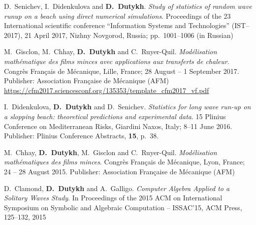 \documentclass[final, a4paper, oneside, 12pt]{article}
\numberwithin{equation}{section}
\begin{document}
\begin{etaremune}
  \item D.~Senichev, I.~Didenkulova and \textbf{D.~Dutykh}. \textit{Study of statistics of random wave runup on a beach using direct numerical simulations}. Proceedings of the 23 International scientific conference ``Information Systems and Technologies'' (IST--2017), 21 April 2017, Nizhny Novgorod, Russia; pp.~1001--1006 (in Russian) %
  
  \item M.~Gisclon, M.~Chhay, \textbf{D.~Dutykh} and C.~Ruyer-Quil. \textit{Mod\'elisation math\'ematique des films minces avec applications aux transferts de chaleur}. Congr\`es Fran\c{c}ais de M\'ecanique, Lille, France; 28 August -- 1 September 2017. Publisher: Association Fran\c{c}aise de M\'ecanique (AFM) \\ %
  \url{https://cfm2017.sciencesconf.org/135353/template_cfm2017_vf.pdf}
  

  
  \item I.~Didenkulova, \textbf{D.~Dutykh} and D.~Senichev. \textit{Statistics for long wave run-up on a slopping beach: theoretical predictions and experimental data}. 15 Plinius Conference on Mediterranean Risks, Giardini Naxos, Italy; 8--11 June 2016. Publisher: Plinius Conference Abstracts, \textbf{15}, p.~38. %

  

  
  \item M.~Chhay, \textbf{D.~Dutykh}, M.~Gisclon and C.~Ruyer-Quil. \textit{Mod\'elisation math\'ematiques des films minces}. Congr\`es Fran\c{c}ais de M\'ecanique, Lyon, France; 24 -- 28 August 2015. Publisher: Association Fran\c{c}aise de M\'ecanique (AFM) \\ %
  
  \item D.~Clamond, \textbf{D.~Dutykh} and A.~Galligo. \textit{Computer Algebra Applied to a Solitary Waves Study}. In Proceedings of the 2015 ACM on International Symposium on Symbolic and Algebraic Computation -- ISSAC'15, ACM Press, 125--132, 2015 %
  

\end{etaremune}
\end{document}
